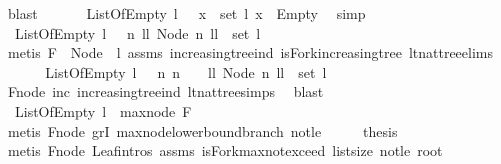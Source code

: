 \begin{isabellebody}
\ blast\isanewline
\ \ \isamarkupfalse%
\ \isamarkupfalse%
\ {\isachardoublequoteopen}{\isasymnot}\ ListOfEmpty\ l\ {\isasymlongrightarrow}\ {\isacharparenleft}{\isasymexists}\ x\ {\isasymin}\ set\ l{\isachardot}\ x\ {\isasymnoteq}\ Empty{\isacharparenright}{\isachardoublequoteclose}\ \isamarkupfalse%
\ simp\isanewline
\ \ \isamarkupfalse%
\ \isamarkupfalse%
\ {\isachardoublequoteopen}{\isasymnot}\ ListOfEmpty\ l\ {\isasymlongrightarrow}\ {\isacharparenleft}{\isasymexists}\ n{\isachardot}\ {\isacharparenleft}{\isasymexists}ll{\isachardot}\ Node\ n\ ll\ {\isasymin}\ set\ l{\isacharparenright}{\isacharparenright}{\isachardoublequoteclose}\isanewline
\ \ \ \ \isamarkupfalse%
\ {\isacharparenleft}metis\ {\isacartoucheopen}F\ {\isacharequal}\ Node\ {}\ l{\isacartoucheclose}\ assms\ increasing{\isacharunderscore}tree{\isacharunderscore}ind\ isFork{\isacharunderscore}increasing{\isacharunderscore}tree\ lt{\isacharunderscore}nat{\isacharunderscore}tree{\isachardot}elims{\isacharparenleft}{}{\isacharparenright}{\isacharparenright}\isanewline
\ \ \isamarkupfalse%
\ \isamarkupfalse%
\ {\isachardoublequoteopen}{\isasymnot}\ ListOfEmpty\ l\ {\isasymlongrightarrow}\ {\isacharparenleft}{\isasymexists}\ n{\isachardot}\ n\ {\isachargreater}\ {}\ {\isasymand}\ {\isacharparenleft}{\isasymexists}ll{\isachardot}\ Node\ n\ ll\ {\isasymin}\ set\ l{\isacharparenright}{\isacharparenright}{\isachardoublequoteclose}\isanewline
\ \ \ \ \isamarkupfalse%
\ Fnode\ inc\ increasing{\isacharunderscore}tree{\isacharunderscore}ind\ lt{\isacharunderscore}nat{\isacharunderscore}tree{\isachardot}simps{\isacharparenleft}{}{\isacharparenright}\ \isamarkupfalse%
\ blast\isanewline
\ \ \isamarkupfalse%
\ \isamarkupfalse%
\ {\isachardoublequoteopen}{\isasymnot}\ ListOfEmpty\ l\ {\isasymlongrightarrow}\ {\isacharparenleft}max{\isacharunderscore}node\ F\ {\isachargreater}\ {}{\isacharparenright}{\isachardoublequoteclose}\isanewline
\ \ \ \ \isamarkupfalse%
\ {\isacharparenleft}metis\ Fnode\ gr{}I\ max{\isacharunderscore}node{\isacharunderscore}lowerbound{\isacharunderscore}branch\ not{\isacharunderscore}le{\isacharparenright}\isanewline
\ \ \isamarkupfalse%
\ \isamarkupfalse%
\ {\isacharquery}thesis\isanewline
\ \ \ \ \isamarkupfalse%
\ {\isacharparenleft}metis\ Fnode\ Leaf{\isachardot}intros\ assms\ isFork{\isacharunderscore}max{\isacharunderscore}not{\isacharunderscore}exceed\ list{\isachardot}size{\isacharparenleft}{}{\isacharparenright}\ not{\isacharunderscore}le\ root{}{\isacharparenright}\ \isanewline

\end{isabellebody}

